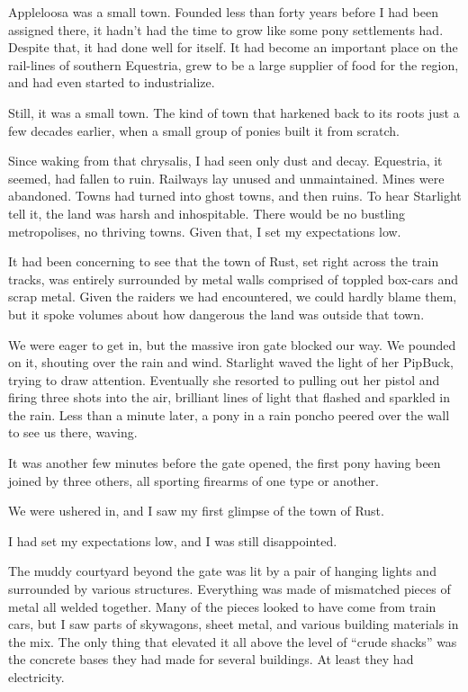 Appleloosa was a small town. Founded less than forty years before I had been assigned there, it hadn’t had the time to grow like some pony settlements had. Despite that, it had done well for itself. It had become an important place on the rail-lines of southern Equestria, grew to be a large supplier of food for the region, and had even started to industrialize.

Still, it was a small town. The kind of town that harkened back to its roots just a few decades earlier, when a small group of ponies built it from scratch.

Since waking from that chrysalis, I had seen only dust and decay. Equestria, it seemed, had fallen to ruin. Railways lay unused and unmaintained. Mines were abandoned. Towns had turned into ghost towns, and then ruins. To hear Starlight tell it, the land was harsh and inhospitable. There would be no bustling metropolises, no thriving towns. Given that, I set my expectations low.

It had been concerning to see that the town of Rust, set right across the train tracks, was entirely surrounded by metal walls comprised of toppled box-cars and scrap metal. Given the raiders we had encountered, we could hardly blame them, but it spoke volumes about how dangerous the land was outside that town.

We were eager to get in, but the massive iron gate blocked our way. We pounded on it, shouting over the rain and wind. Starlight waved the light of her PipBuck, trying to draw attention. Eventually she resorted to pulling out her pistol and firing three shots into the air, brilliant lines of light that flashed and sparkled in the rain. Less than a minute later, a pony in a rain poncho peered over the wall to see us there, waving.

It was another few minutes before the gate opened, the first pony having been joined by three others, all sporting firearms of one type or another.

We were ushered in, and I saw my first glimpse of the town of Rust.

I had set my expectations low, and I was still disappointed.

The muddy courtyard beyond the gate was lit by a pair of hanging lights and surrounded by various structures. Everything was made of mismatched pieces of metal all welded together. Many of the pieces looked to have come from train cars, but I saw parts of skywagons, sheet metal, and various building materials in the mix. The only thing that elevated it all above the level of “crude shacks” was the concrete bases they had made for several buildings. At least they had electricity.

